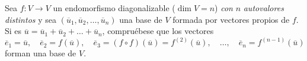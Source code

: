 \begin{enunciado}
 Sea $f:V\to V$ un endomorfismo diagonalizable ($\dim V = n$) \textit{con}
 $n$ \textit{autovalores distintos} y sea $(\overline{u}_1, \overline{u}_2, \ldots, \overline{u}_n)$ una base de $V$ formada por vectores propios de $f$. Si es $\overline{u} = \overline{u}_1 + \overline{u}_2 + \ldots + \overline{u}_n$, compru\'ebese que los vectores
 \begin{equation*}
  \overline{e}_1 = \overline{u}, \quad \overline{e}_2 = f\left( \overline{u} \right), \quad \overline{e}_3 = (f\circ f)\left( \overline{u} \right) = f^{(2)}\left( \overline{u} \right), \quad \ldots, \quad \overline{e}_n = f^{(n-1)}\left( \overline{u} \right)
 \end{equation*}
 forman una base de $V$.
\end{enunciado}

